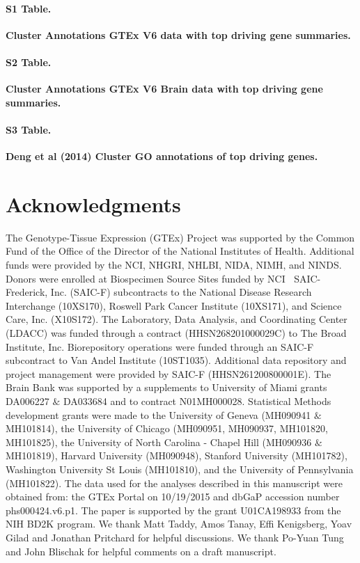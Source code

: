 \documentclass[10pt,letterpaper]{article}
\begin{document}
\paragraph*{S1 Table.}
\label{supptab1}
{\bf Cluster Annotations GTEx V6 data with top driving gene summaries.}

\paragraph*{S2 Table.}
\label{supptab2}
{\bf Cluster Annotations GTEx V6 Brain data with top driving gene summaries.}

\paragraph*{S3 Table.}
\label{supptab3}
{\bf Deng et al (2014) Cluster GO annotations of top driving genes.}




\section*{Acknowledgments}
The Genotype-Tissue Expression (GTEx) Project was supported by the Common Fund of the Office of the Director of the National Institutes of Health. Additional funds were provided by the NCI, NHGRI, NHLBI, NIDA, NIMH, and NINDS. Donors were enrolled at Biospecimen Source Sites funded by NCI $\ $ SAIC-Frederick, Inc. (SAIC-F) subcontracts to the National Disease Research Interchange (10XS170), Roswell Park Cancer Institute (10XS171), and Science Care, Inc. (X10S172). The Laboratory, Data Analysis, and Coordinating Center (LDACC) was funded through a contract (HHSN268201000029C) to The Broad Institute, Inc. Biorepository operations were funded through an SAIC-F subcontract to Van Andel Institute (10ST1035). Additional data repository and project management were provided by SAIC-F (HHSN261200800001E). The Brain Bank was supported by a supplements to University of Miami grants DA006227 $\&$ DA033684 and to contract N01MH000028. Statistical Methods development grants were made to the University of Geneva (MH090941 $\&$ MH101814), the University of Chicago (MH090951, MH090937, MH101820, MH101825), the University of North Carolina - Chapel Hill (MH090936 $\&$ MH101819), Harvard University (MH090948), Stanford University (MH101782), Washington University St Louis (MH101810), and the University of Pennsylvania (MH101822). The data used for the analyses described in this manuscript were obtained from: the GTEx Portal on 10/19/2015 and  dbGaP accession number phs000424.v6.p1.
The paper is supported by the grant U01CA198933 from the NIH BD2K program. We thank Matt Taddy, Amos Tanay, Effi Kenigsberg, Yoav Gilad and Jonathan Pritchard for helpful discussions. We thank Po-Yuan Tung and John Blischak for helpful comments on a draft manuscript.
\end{document}
